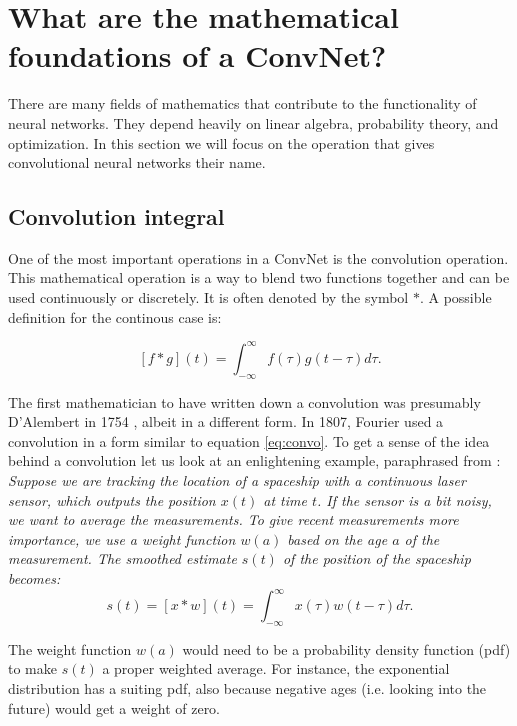 \section{What are the mathematical foundations of a ConvNet?}
\label{sec:math}

There are many fields of mathematics that contribute to the functionality of neural networks. They depend heavily on linear algebra, probability theory, and optimization. In this section we will focus on the operation that gives convolutional neural networks their name.

\subsection{Convolution integral}

One of the most important operations in a ConvNet is the convolution operation. This mathematical operation is a way to blend two functions together \cite{wolf} and can be used continuously or discretely. It is often denoted by the symbol $*$. A possible definition for the continous case is:

\begin{equation}\label{eq:convo}
    [f * g] (t) = \int_{-\infty}^{\infty} f(\tau)g(t-\tau) d\tau.
\end{equation}

The first mathematician to have written down a convolution was presumably D'Alembert in 1754 \cite{tor}, albeit in a different form. In 1807, Fourier used a convolution in a form similar to equation \eqref{eq:convo}. To get a sense of the idea behind a convolution let us look at an enlightening example, paraphrased from \cite[Ch. 9]{dl-book}:\\

\textit{Suppose we are tracking the location of a spaceship with a continuous laser sensor, which outputs the position $x(t)$ at time $t$. If the sensor is a bit noisy, we want to average the measurements. To give recent measurements more importance, we use a weight function $w(a)$ based on the age $a$ of the measurement. The smoothed estimate $s(t)$ of the position of the spaceship becomes:
}
\begin{equation}
    s(t) = [x*w](t) = \int_{-\infty}^{\infty} x(\tau)w(t-\tau)d\tau.
\end{equation}

The weight function $w(a)$ would need to be a probability density function (pdf) to make $s(t)$ a proper weighted average. For instance, the exponential distribution has a suiting pdf, also because negative ages (i.e. looking into the future) would get a weight of zero.\\


